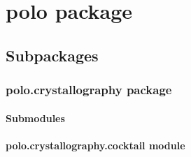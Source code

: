 \documentclass[letterpaper,10pt,english]{sphinxmanual}
\begin{document}
\chapter{polo package}
\label{\detokenize{polo:polo-package}}\label{\detokenize{polo::doc}}

\section{Subpackages}
\label{\detokenize{polo:subpackages}}

\subsection{polo.crystallography package}
\label{\detokenize{polo.crystallography:polo-crystallography-package}}\label{\detokenize{polo.crystallography::doc}}

\subsubsection{Submodules}
\label{\detokenize{polo.crystallography:submodules}}

\subsubsection{polo.crystallography.cocktail module}
\label{\detokenize{polo.crystallography:module-polo.crystallography.cocktail}}\label{\detokenize{polo.crystallography:polo-crystallography-cocktail-module}}
\end{document}

